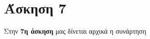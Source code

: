 \documentclass[Second Project.tex]{subfiles}
\begin{document}
\section{ Άσκηση 7 }
Στην \textbf{7η άσκηση} μας δίνεται αρχικά η συνάρτηση 
\end{document}
